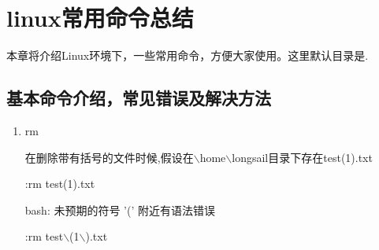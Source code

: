 
\chapter{linux常用命令总结}
\label{chap07}

本章将介绍Linux环境下，一些常用命令，方便大家使用。这里默认目录是\home\longsail.

\section{基本命令介绍，常见错误及解决方法}


\begin{enumerate}

\item rm



在删除带有括号的文件时候,假设在$\backslash$home$\backslash$longsail目录下存在test(1).txt

:rm test(1).txt

bash: 未预期的符号 '(' 附近有语法错误

:rm test$\backslash$(1$\backslash$).txt

\end{enumerate}


